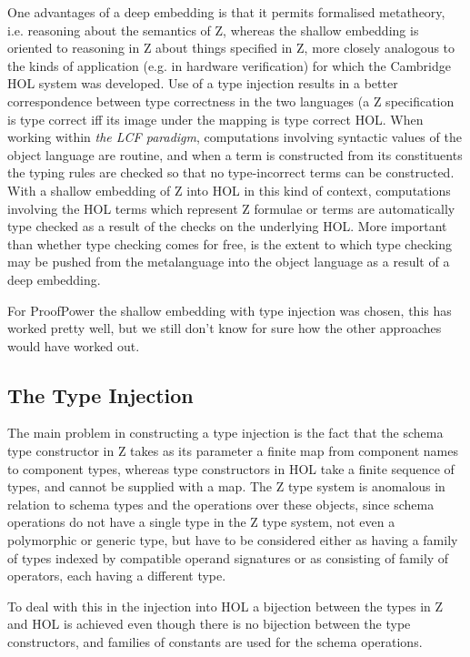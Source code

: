 \documentclass[10pt,titlepage]{book}
\begin{document}
One advantages of a deep embedding is that it permits formalised metatheory, i.e. reasoning about the semantics of Z, whereas the shallow embedding is oriented to reasoning in Z about things specified in Z, more closely analogous to the kinds of application (e.g. in hardware verification) for which the Cambridge HOL system was developed.
Use of a type injection results in a better correspondence between type correctness in the two languages (a Z specification is type correct iff its image under the mapping is type correct HOL.
When working within {\it the LCF paradigm}, computations involving syntactic values of the object language are routine, and when a term is constructed from its constituents the typing rules are checked so that no type-incorrect terms can be constructed.
With a shallow embedding of Z into HOL in this kind of context, computations involving the HOL terms which represent Z formulae or terms are automatically type checked as a result of the checks on the underlying HOL.
More important than whether type checking comes for free, is the extent to which type checking may be pushed from the metalanguage into the object language as a result of a deep embedding.


For ProofPower the shallow embedding with type injection was chosen, this has worked pretty well, but we still don't know for sure how the other approaches would have worked out.

\subsection{The Type Injection}

The main problem in constructing a type injection is the fact that the schema type constructor in Z takes as its parameter a finite map from component names to component types, whereas type constructors in HOL take a finite sequence of types, and cannot be supplied with a map.
The Z type system is anomalous in relation to schema types and the operations over these objects, since schema operations do not have a single type in the Z type system, not even a polymorphic or generic type, but have to be considered either as having a family of types indexed by compatible operand signatures or as consisting of family of operators, each having a different type.

To deal with this in the injection into HOL a bijection between the types in Z and HOL is achieved even though there is no bijection between the type constructors, and families of constants are used for the schema operations.
\end{document}
